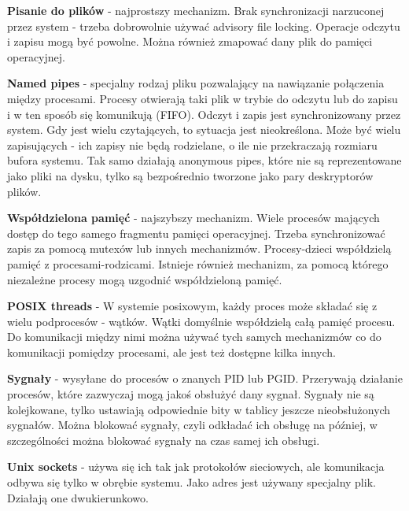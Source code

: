 \textbf{Pisanie do plików} - najprostszy mechanizm. Brak synchronizacji narzuconej przez system - trzeba dobrowolnie używać advisory file locking. Operacje odczytu i zapisu mogą być powolne. Można również zmapować dany plik do pamięci operacyjnej.

\textbf{Named pipes} - specjalny rodzaj pliku  pozwalający na nawiązanie połączenia między procesami. Procesy otwierają taki plik w trybie do odczytu lub do zapisu i w ten sposób się komunikują (FIFO). Odczyt i zapis jest synchronizowany przez system. Gdy jest wielu czytających, to sytuacja jest nieokreślona. Może być wielu zapisujących - ich zapisy nie będą rodzielane, o ile nie przekraczają rozmiaru bufora systemu. Tak samo działają anonymous pipes, które nie są reprezentowane jako pliki na dysku, tylko są bezpośrednio tworzone jako pary deskryptorów plików.

\textbf{Współdzielona pamięć} - najszybszy mechanizm. Wiele procesów mających dostęp do tego samego fragmentu pamięci operacyjnej. Trzeba synchronizować zapis za pomocą mutexów lub innych mechanizmów. Procesy-dzieci współdzielą pamięć z procesami-rodzicami. Istnieje również mechanizm, za pomocą którego niezależne procesy mogą uzgodnić współdzieloną pamięć.

\textbf{POSIX threads} - W systemie posixowym, każdy proces może składać się z wielu podprocesów - wątków. Wątki domyślnie współdzielą całą pamięć procesu. Do komunikacji między nimi można używać tych samych mechanizmów co do komunikacji pomiędzy procesami, ale jest też dostępne kilka innych.

\textbf{Sygnały} - wysyłane do procesów o znanych PID lub PGID. Przerywają działanie procesów, które zazwyczaj mogą jakoś obsłużyć dany sygnał. Sygnały nie są kolejkowane, tylko ustawiają odpowiednie bity w tablicy jeszcze nieobsłużonych sygnałów. Można blokować sygnały, czyli odkładać ich obsługę na później, w szczególności można blokować sygnały na czas samej ich obsługi.

\textbf{Unix sockets} - używa się ich tak jak protokołów sieciowych, ale komunikacja odbywa się tylko w obrębie systemu. Jako adres jest używany specjalny plik. Działają one dwukierunkowo.
